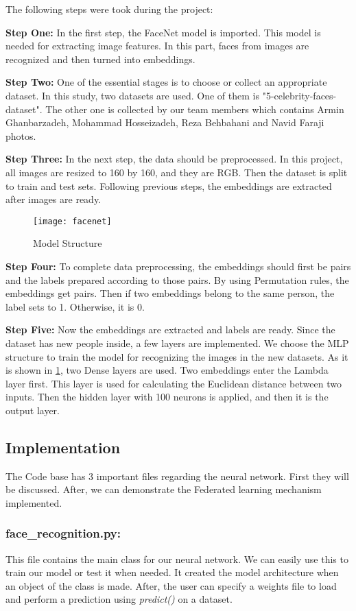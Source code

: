 The following steps were took during the project:

\textbf{Step One:} In the first step, the FaceNet model is imported. This model is needed for extracting image features. In this part, faces from images are recognized and then turned into embeddings. 

\textbf{Step Two:} One of the essential stages is to choose or collect an appropriate dataset. In this study, two datasets are used. One of them is "5-celebrity-faces-dataset". The other one is collected by our team members which contains Armin Ghanbarzadeh, Mohammad Hosseizadeh, Reza Behbahani and Navid Faraji photos.

\textbf{Step Three:} In the next step, the data should be preprocessed. In this project, all images are resized to 160 by 160, and they are RGB. Then the dataset is split to train and test sets. Following previous steps, the embeddings are extracted after images are ready. 

\begin{figure}[H]
	\centering
	\texttt{[image: facenet]}
	\caption{Model Structure}
	\label{fig:f5}
\end{figure}

\textbf{Step Four:} To complete data preprocessing, the embeddings should first be pairs and the labels prepared according to those pairs. By using Permutation rules, the embeddings get pairs. Then if two embeddings belong to the same person, the label sets to 1. Otherwise, it is 0.

\textbf{Step Five:} Now the embeddings are extracted and labels are ready. Since the dataset has new people inside, a few layers are implemented. We choose the MLP structure to train the model for recognizing the images in the new datasets. As it is shown in \ref{fig:f5}, two Dense layers are used. Two embeddings enter the Lambda layer first. This layer is used for calculating the Euclidean distance between two inputs. Then the hidden layer with 100 neurons is applied, and then it is the output layer.


\newpage
\subsection*{Implementation}

The Code base has 3 important files regarding the neural network. First they will be discussed. After, we can demonstrate the Federated learning mechanism implemented. 

\subsubsection*{face\_recognition.py:} This file contains the main class for our neural network. We can easily use this to train our model or test it when needed. It created the model architecture when an object of the class is made. After, the user can specify a weights file to load and perform a prediction using \textit{predict()} on a dataset. 


